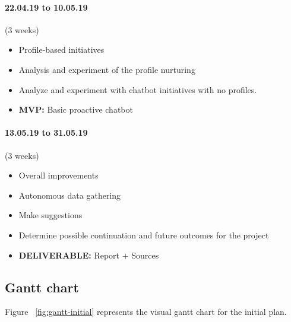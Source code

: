 \paragraph{22.04.19 to 10.05.19} (3 weeks)
\begin{itemize}
	\setlength\itemsep{0em}
	\item Profile-based initiatives
	\item Analysis and experiment of the profile nurturing 
	\item Analyze and experiment with chatbot initiatives with no profiles.
	\item \textbf{MVP:} Basic proactive chatbot
\end{itemize}

\paragraph{13.05.19 to 31.05.19} (3 weeks)
\begin{itemize}
	\setlength\itemsep{0em}
	\item Overall improvements
	\item Autonomous data gathering
	\item Make suggestions
	\item Determine possible continuation and future outcomes for the project
	\item \textbf{DELIVERABLE:} Report + Sources
\end{itemize}

\subsection{Gantt chart}
Figure ~\ref{fig:gantt-initial} represents the visual gantt chart for the initial plan.



